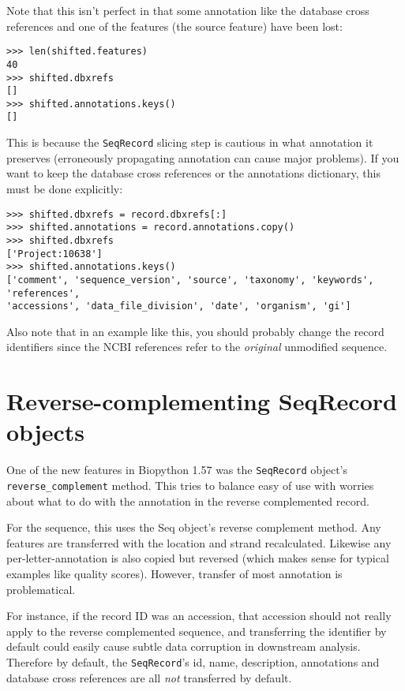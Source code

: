 Note that this isn't perfect in that some annotation like the database cross references
and one of the features (the source feature) have been lost:

\begin{verbatim}
>>> len(shifted.features)
40
>>> shifted.dbxrefs
[]
>>> shifted.annotations.keys()
[]
\end{verbatim}

This is because the \verb|SeqRecord| slicing step is cautious in what annotation
it preserves (erroneously propagating annotation can cause major problems). If
you want to keep the database cross references or the annotations dictionary,
this must be done explicitly:

\begin{verbatim}
>>> shifted.dbxrefs = record.dbxrefs[:]
>>> shifted.annotations = record.annotations.copy()
>>> shifted.dbxrefs
['Project:10638']
>>> shifted.annotations.keys()
['comment', 'sequence_version', 'source', 'taxonomy', 'keywords', 'references',
'accessions', 'data_file_division', 'date', 'organism', 'gi']
\end{verbatim}

Also note that in an example like this, you should probably change the record
identifiers since the NCBI references refer to the \emph{original} unmodified
sequence.

\section{Reverse-complementing SeqRecord objects}
\label{sec:SeqRecord-reverse-complement}

One of the new features in Biopython 1.57 was the \verb|SeqRecord| object's
\verb|reverse_complement| method. This tries to balance easy of use with worries
about what to do with the annotation in the reverse complemented record.

For the sequence, this uses the Seq object's reverse complement method. Any
features are transferred with the location and strand recalculated. Likewise
any per-letter-annotation is also copied but reversed (which makes sense for
typical examples like quality scores). However, transfer of most annotation
is problematical.

For instance, if the record ID was an accession, that accession should not really
apply to the reverse complemented sequence, and transferring the identifier by
default could easily cause subtle data corruption in downstream analysis.
Therefore by default, the \verb|SeqRecord|'s id, name, description, annotations
and database cross references are all \emph{not} transferred by default.

